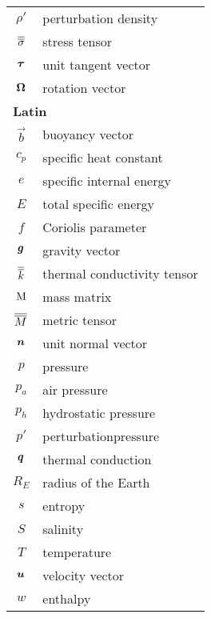 \begin{center}
\begin{longtable}{cl}
$\rho'$      & perturbation density\\
$\overline{\overline{\sigma}}$   & stress tensor\\
${\mbox{\boldmath$\tau$}}$     & unit tangent vector\\
${\mbox{\boldmath$\Omega$}}$   & rotation vector\\
\hline
%
\multicolumn{2}{l}{{\bf Latin}} \\ \hline
%
$\vec{b}$      & buoyancy vector\\
$c_p$       & specific heat constant\\
$e$         & specific internal energy\\
$E$         & total specific energy\\
$f$         & Coriolis parameter\\
${\mbox{\boldmath$g$}}$      & gravity vector\\
$\overline{\overline{k}}$    & thermal conductivity tensor\\
$\mathrm{M}$   & mass matrix\\
$\overline{\overline{M}}$   & metric tensor\\
${\mbox{\boldmath$n$}}$      & unit normal vector\\
$p$         & pressure\\
$p_a$       & air pressure\\
$p_h$       & hydrostatic pressure\\
$p'$        & perturbationpressure\\
${\mbox{\boldmath$q$}}$      & thermal conduction\\
$R_E$       & radius of the Earth\\
$s$         & entropy\\
$S$         & salinity\\
$T$         & temperature\\
${\mbox{\boldmath$u$}}$      & velocity vector\\
$w$         & enthalpy\\


\end{longtable}
\end{center}